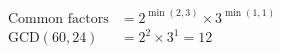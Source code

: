 \documentclass[preview]{standalone}
\begin{document}
\begin{align*}
\text{Common factors} &= 2^{\min(2,3)} \times 3^{\min(1,1)} \\ \text{GCD}(60,24) &= 2^2 \times 3^1 = 12
\end{align*}
\end{document}
